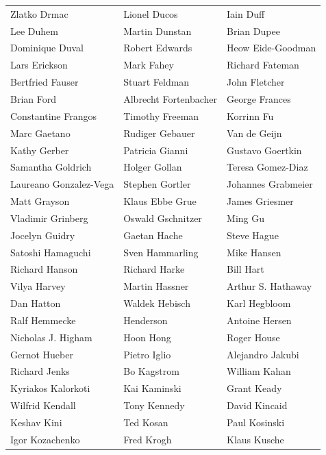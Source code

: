 \begin{tabular}{lll}
Zlatko Drmac           & Lionel Ducos           & Iain Duff\\
Lee Duhem              & Martin Dunstan         & Brian Dupee\\
Dominique Duval        & Robert Edwards         & Heow Eide-Goodman\\
Lars Erickson          & Mark Fahey             & Richard Fateman\\
Bertfried Fauser       & Stuart Feldman         & John Fletcher\\
Brian Ford             & Albrecht Fortenbacher  & George Frances\\
Constantine Frangos    & Timothy Freeman        & Korrinn Fu\\
Marc Gaetano           & Rudiger Gebauer        & Van de Geijn\\
Kathy Gerber           & Patricia Gianni        & Gustavo Goertkin\\
Samantha Goldrich      & Holger Gollan          & Teresa Gomez-Diaz\\
Laureano Gonzalez-Vega & Stephen Gortler        & Johannes Grabmeier\\
Matt Grayson           & Klaus Ebbe Grue        & James Griesmer\\
Vladimir Grinberg      & Oswald Gschnitzer      & Ming Gu\\
Jocelyn Guidry         & Gaetan Hache           & Steve Hague\\
Satoshi Hamaguchi      & Sven Hammarling        & Mike Hansen\\
Richard Hanson         & Richard Harke          & Bill Hart\\
Vilya Harvey           & Martin Hassner         & Arthur S. Hathaway\\
Dan Hatton             & Waldek Hebisch         & Karl Hegbloom\\
Ralf Hemmecke          & Henderson              & Antoine Hersen\\
Nicholas J. Higham     & Hoon Hong              & Roger House\\
Gernot Hueber          & Pietro Iglio           & Alejandro Jakubi\\
Richard Jenks          & Bo Kagstrom            & William Kahan\\
Kyriakos Kalorkoti     & Kai Kaminski           & Grant Keady\\
Wilfrid Kendall        & Tony Kennedy           & David Kincaid\\
Keshav Kini            & Ted Kosan              & Paul Kosinski\\
Igor Kozachenko        & Fred Krogh             & Klaus Kusche\\
\end{tabular}
